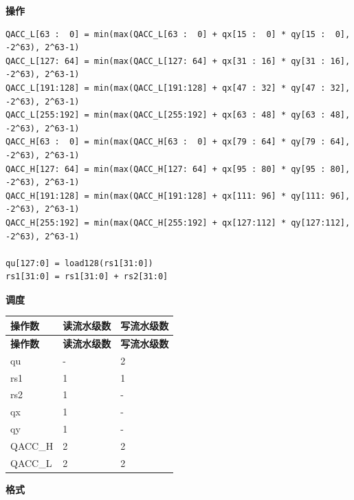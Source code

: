 \textbf{操作}\\
\begin{lstlisting}
QACC_L[63 :  0] = min(max(QACC_L[63 :  0] + qx[15 :  0] * qy[15 :  0], -2^63), 2^63-1)
QACC_L[127: 64] = min(max(QACC_L[127: 64] + qx[31 : 16] * qy[31 : 16], -2^63), 2^63-1)
QACC_L[191:128] = min(max(QACC_L[191:128] + qx[47 : 32] * qy[47 : 32], -2^63), 2^63-1)
QACC_L[255:192] = min(max(QACC_L[255:192] + qx[63 : 48] * qy[63 : 48], -2^63), 2^63-1)
QACC_H[63 :  0] = min(max(QACC_H[63 :  0] + qx[79 : 64] * qy[79 : 64], -2^63), 2^63-1)
QACC_H[127: 64] = min(max(QACC_H[127: 64] + qx[95 : 80] * qy[95 : 80], -2^63), 2^63-1)
QACC_H[191:128] = min(max(QACC_H[191:128] + qx[111: 96] * qy[111: 96], -2^63), 2^63-1)
QACC_H[255:192] = min(max(QACC_H[255:192] + qx[127:112] * qy[127:112], -2^63), 2^63-1)

qu[127:0] = load128(rs1[31:0])
rs1[31:0] = rs1[31:0] + rs2[31:0]
\end{lstlisting}

\textbf{调度}\\
\begin{longtable}[c]{|l|l|l|}
    \hline
    \rowcolor{lightgray}
    \textbf{操作数} & \textbf{读流水级数} & \textbf{写流水级数} \\\hline
    \endfirsthead
    \hline
    \rowcolor{lightgray}
     \textbf{操作数} & \textbf{读流水级数} & \textbf{写流水级数} \\\hline
    \endhead
    \hline
    \endfoot

    qu & - & 2 \\\hline
    rs1 & 1 & 1 \\\hline
    rs2 & 1 & - \\\hline
     qx & 1 & - \\\hline
     qy & 1 & - \\\hline
     QACC\_H & 2 & 2 \\\hline
     QACC\_L & 2 & 2

\end{longtable}

\textbf{格式}\\

